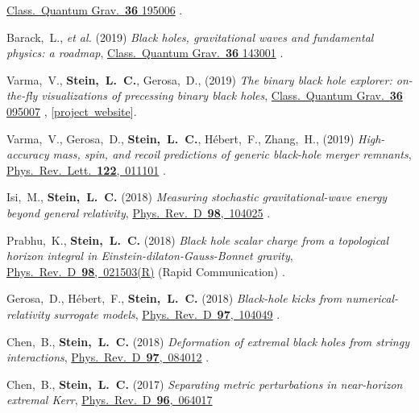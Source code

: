\begin{etaremune}[start=\value{pubCounter}]
  \href{https://doi.org/10.1088/1361-6382/ab34e2}{Class.~Quantum Grav.~{\bf 36} 195006}
  .
\item
  Barack,~L., {\it et al.}
  (2019)
  {\it Black holes, gravitational waves and fundamental physics: a roadmap},
  \href{https://doi.org/10.1088/1361-6382/ab0587}{Class.~Quantum Grav.~{\bf 36} 143001}
  .
\item
  Varma,~V., {\bf Stein,~L.~C.}, Gerosa,~D.,
  (2019)
  {\it The binary black hole explorer: on-the-fly visualizations of precessing binary black holes},
  \href{https://doi.org/10.1088/1361-6382/ab0ee9}{Class.~Quantum Grav.~{\bf 36} 095007}
  ,
  [\href{https://vijayvarma392.github.io/binaryBHexp/}{project~website}].
\item
  Varma,~V., Gerosa,~D., {\bf Stein,~L.~C.}, H\'ebert,~F.,  Zhang,~H.,
  (2019)
  {\it High-accuracy mass, spin, and recoil predictions of generic black-hole merger remnants},
  \href{https://doi.org/10.1103/PhysRevLett.122.011101}{Phys.~Rev.~Lett.~{\bf 122},~011101}
  .
\item
  Isi,~M., {\bf Stein,~L.~C.}
  (2018)
  {\it Measuring stochastic gravitational-wave energy beyond general relativity},
  \href{https://doi.org/10.1103/PhysRevD.98.104025}{Phys.~Rev.~D~{\bf 98},~104025}
  .
\item
  Prabhu,~K., {\bf Stein,~L.~C.}
  (2018)
  {\it Black hole scalar charge from a topological horizon integral in
    Einstein-dilaton-Gauss-Bonnet gravity},
  \href{https://doi.org/10.1103/PhysRevD.98.021503}{Phys.~Rev.~D~{\bf 98},~021503(R)}
  (Rapid Communication)
  .
\item
  Gerosa,~D., H\'ebert,~F., {\bf Stein,~L.~C.}
  (2018)
  {\it Black-hole kicks from numerical-relativity surrogate models},
  \href{https://doi.org/10.1103/PhysRevD.97.104049}{Phys.~Rev.~D~{\bf 97},~104049}
  .
\item
  Chen,~B., {\bf Stein,~L.~C.}
  (2018)
  {\it Deformation of extremal black holes from stringy interactions},
  \href{https://doi.org/10.1103/PhysRevD.97.084012}{Phys.~Rev.~D~{\bf 97},~084012}
  .
\item
  Chen,~B., {\bf Stein,~L.~C.}
  (2017)
  {\it Separating metric perturbations in near-horizon extremal Kerr},
  \href{https://doi.org/10.1103/PhysRevD.96.064017}{Phys.~Rev.~D~{\bf 96},~064017}

\end{etaremune}

